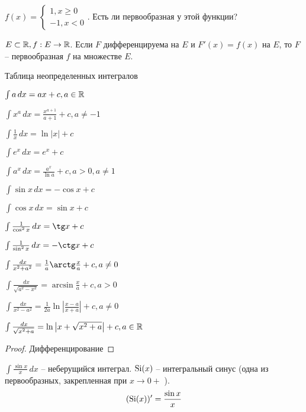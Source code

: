 \begin{Ex}
	$f(x) = \begin{cases}
		1, x \geqslant 0 \\
		-1, x < 0
	\end{cases}$. Есть ли первообразная у этой функции?
\end{Ex}

\begin{Def}
	$E \subset \mathbb{R}, f : E \to \mathbb{R}$. Если $F$ дифференцируема на $E$ и $F'(x) = f(x)$ на $E$, то $F$ -- первообразная $f$ на множестве $E$.
\end{Def}

\Pagebreak
Таблица неопределенных интегралов

\begin{multicols}{2}
	\begin{MyList}
		\item $\int a \,dx = ax + c, a \in \mathbb{R}$ 
		\item $\int x^a \,dx = \frac{x^{a + 1}}{a + 1} + c, a \neq -1$ 
		\item $\int \frac{1}{x}\,dx = \ln |x| + c$ 
		\item $\int e^x \,dx = e^x + c$ 
		\item $\int a^x \,dx = \frac{a^x}{\ln a} + c, a > 0, a \neq 1$ 
		\item $\int \sin x \,dx = -\cos x + c$
		\item $\int \cos x \,dx = \sin x + c$ 
		\item $\int \frac{1}{\cos^2 x}\,dx = \tg x + c$ 
		\item $\int \frac{1}{\sin^2 x}\,dx = -\ctg x + c$ 
		\item $\int \frac{\,dx}{x^2 + a^2} = \frac{1}{a} \arctg \frac{x}{a} + c, a \neq 0$
		\item $\int \frac{\,dx}{\sqrt{a^2 - x^2}} = \arcsin \frac{x}{a} + c, a > 0$
		\item $\int \frac{\,dx}{x^2 - a^2} = \frac{1}{2a}\ln \left| \frac{x - a}{x + a}\right| + c, a \neq 0$ 
		\item $\int \frac{\,dx}{\sqrt{x^2 + a}} = \ln \left| x + \sqrt{x^2 + a}\right| + c, a \in \mathbb{R}$   
	\end{MyList}	
\end{multicols}

\begin{proof}
	Дифференцирование
\end{proof}

\begin{Example}
	$\int \frac{\sin x}{x} \,dx$ -- неберущийся интеграл.
	$\operatorname{Si}(x)$ -- интегральный синус (одна из первообразных, закрепленная при $x \to 0+$ ).
	\[(\operatorname{Si}(x))' = \frac{\sin x}{x}\]
\end{Example}

